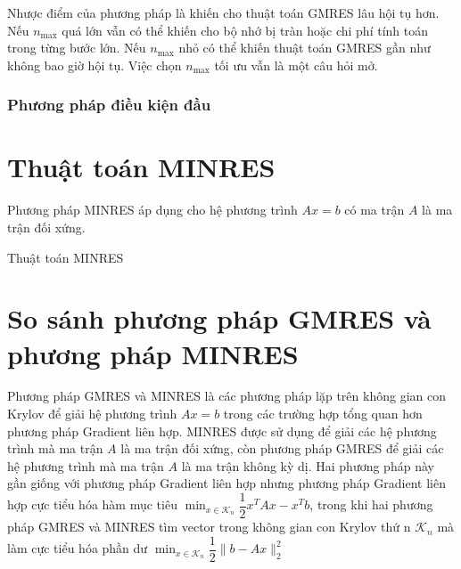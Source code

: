 \documentclass[14pt, a4paper]{article}
\numberwithin{equation}{section}
\numberwithin{algorithm}{section}
\numberwithin{figure}{section}
\numberwithin{dl}{section}
\numberwithin{md}{section}
\numberwithin{bd}{section}
\begin{document}
Nhược điểm của phương pháp là khiến cho thuật toán GMRES lâu hội tụ hơn. Nếu $n_{\max}$ quá lớn vẫn có thể khiến cho bộ nhớ bị tràn hoặc chi phí tính toán trong từng bước lớn. Nếu $n_{\max}$ nhỏ có thể khiến thuật toán GMRES gần như không bao giờ hội tụ. Việc chọn $n_{\max}$ tối ưu vẫn là một câu hỏi mở.

\subsubsection{Phương pháp điều kiện đầu}

\section{Thuật toán MINRES}

Phương pháp MINRES áp dụng cho hệ phương trình $Ax=b$ có ma trận $A$ là ma trận đối xứng.

\begin{algorithm}
    \caption{Thuật toán MINRES}\label{alg:MINRES}
    \begin{algorithmic}
        \EndFor
    \end{algorithmic}
\end{algorithm}


\section{So sánh phương pháp GMRES và phương pháp MINRES}

Phương pháp GMRES và MINRES là các phương pháp lặp trên không gian con Krylov để giải hệ phương trình $Ax=b$ trong các trường hợp tổng quan hơn phương pháp Gradient liên hợp.
MINRES được sử dụng để giải các hệ phương trình mà ma trận $A$ là ma trận đối xứng, còn phương pháp GMRES để giải các hệ phương trình mà ma trận $A$ là ma trận không kỳ dị.
Hai phương pháp này gần giống với phương pháp Gradient liên hợp nhưng phương pháp Gradient liên hợp cực tiểu hóa hàm mục tiêu $\displaystyle \min_{x \in \mathcal{K}_n}\dfrac{1}{2}x^TAx - x^Tb$,
trong khi hai phương pháp GMRES và MINRES tìm vector trong không gian con Krylov thứ n $\displaystyle \mathcal{K}_n$ mà làm cực tiểu hóa phần dư $\displaystyle \min_{x \in \mathcal{K}_n}\dfrac{1}{2}\lVert b - Ax \rVert_2^2$
\end{document}
